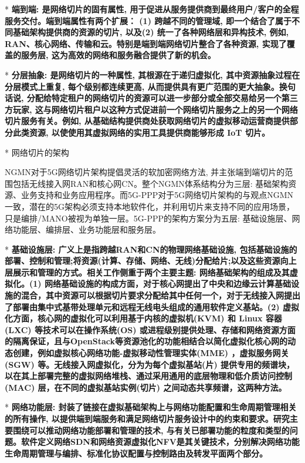 		* \bf{端到端}: 是网络切片的固有属性, 用于促进从服务提供商到最终用户/客户的全程服务交付。端到端属性有两个扩展： (1) 跨越不同的管理域, 即一个结合了属于不同基础架构提供商的资源的切片, 以及(2) 统一了各种网络层和异构技术, 例如, RAN、核心网络、传输和云。特别是端到端网络切片整合了各种资源, 实现了覆盖的服务层, 这为高效的网络和服务融合提供了新的机会。

		* \bf{分层抽象}: 是网络切片的一种属性, 其根源在于递归虚拟化, 其中资源抽象过程在分层模式上重复, 每个级别都连续更高, 从而提供具有更广范围的更大抽象。换句话说, 分配给特定租户的网络切片的资源可以进一步部分或全部交易给另一个第三方玩家, 这与网络切片租户以这种方式促进前一个网络切片服务之上的另一个网络切片服务有关。例如, 从基础结构提供商处获取网络切片的虚拟移动运营商提供部分此类资源, 以使使用其虚拟网络的实用工具提供商能够形成 IoT 切片。


* 网络切片的架构

	NGMN对于5G网络切片架构提倡灵活的软加密网络方法, 并主张端到端切片的范围包括无线接入网RAN和核心网CN。整个NGMN体系结构分为三层: 基础架构资源、业务支持和业务应用程序。而5G-PPP对于5G网络切片架构的与观点NGMN一致，潜在的5G架构必须支持本地软件化，并利用切片来支持不同的应用场景，只是编排/MANO被视为单独一层。5G-PPP的架构方案分为五层: 基础设施层、网络功能层、编排层、业务功能层和服务层。

	* \bf{基础设施层}: 广义上是指跨越RAN和CN的物理网络基础设施, 包括基础设施的部署、控制和管理;将资源(计算、存储、网络、无线)分配给片;以及这些资源向上层展示和管理的方式。相关工作侧重于两个主要主题: 网络基础架构的组成及其虚拟化。(1) 网络基础设施的构成方面，对于核心网提出了中央和边缘云计算基础设施的混合，其中资源可以根据切片要求分配给其中任何一个，对于无线接入网提出了部署由集中式基带处理单元和远程无线电头组成的通用软件定义基站。(2) 虚拟化方面，核心网的虚拟化可以利用基于内核的虚拟机(KVM) 和 Linux 容器(LXC) 等技术可以在操作系统(OS) 或进程级别提供处理、存储和网络资源方面的隔离保证，且与OpenStack等资源池化的功能相结合以简化虚拟化核心网的动态创建，例如虚拟核心网络功能-虚拟移动性管理实体(MME) ，虚拟服务网关(SGW) 等。无线接入网虚拟化，分为为每个虚拟基站(片) 提供专用的频谱块，以在其上部署完整的虚拟网络堆栈、通过采用通用的底层物理和低介质访问控制 (MAC)  层，在不同的虚拟基站实例(切片) 之间动态共享频谱，这两种方法。

	* \bf{网络功能层}: 封装了链接在虚拟基础架构上与网络功能配置和生命周期管理相关的所有操作, 以提供端到端服务和满足网络切片服务设计中的约束和要求。研究主要围绕可以推动网络功能部署和管理的技术, 与有关已部署功能的粒度和类型的问题。软件定义网络SDN和网络资源虚拟化NFV是其关键技术，分别解决网络功能生命周期管理与编排、标准化协议配置与控制路由及转发平面两个部分。

